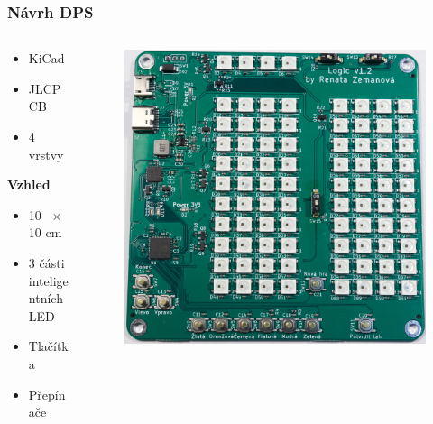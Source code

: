 \documentclass[%
  12pt,       				%
	t,                  %
	aspectratio=1610,   %
	unicode,						%
]{beamer}				    	%
\begin{document}
\begin{frame} 
	\frametitle{Návrh DPS}
		\begin{columns}[T] 	
		\begin{column}{0.4\textwidth}		%
			\vspace{0.5cm}
			\begin{itemize}
				\item KiCad
				\item JLCPCB
				\item 4 vrstvy
			\end{itemize}
			\vspace{0.5cm}
			\textbf{Vzhled}
			\begin{itemize}
				\item 10 ~$\times$ 10 cm
				\item 3 části inteligentních LED
				\item Tlačítka
				\item Přepínače
			\end{itemize}
		\end{column}

		\begin{column}{0.6\textwidth}		%
			\begin{figure}%
				\centering
				\includegraphics[width=0.8\columnwidth]{obrazky/Finalni_verze.jpg}
			\end{figure}%
		\end{column}
	\end{columns}
\end{frame}
\end{document}

